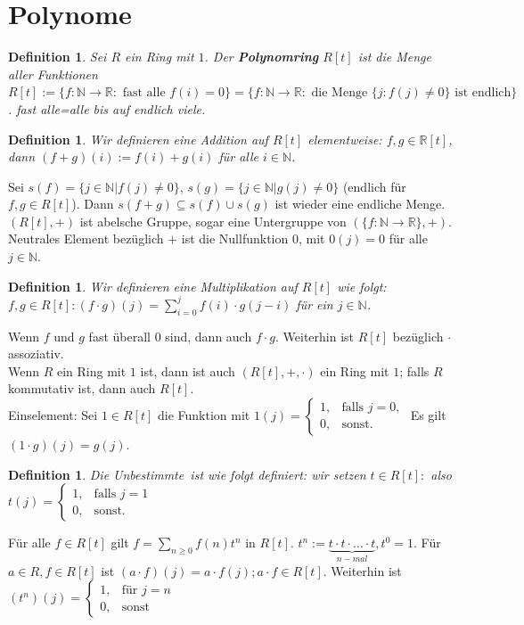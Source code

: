 \documentclass[12pt,a4paper]{article}
\theoremstyle{plain}
\newtheorem{Definition}[Theorem]{Definition}
\newcommand{\N}{\mathbb{N}}
\newcommand{\R}{\mathbb{R}}
\numberwithin{equation}{section}
\begin{document}
\section{Polynome}
\begin{Definition}
Sei $R$ ein Ring mit $1$. Der \textbf{Polynomring} $R[t]$ ist die Menge aller Funktionen $R[t]:=\{f:\N\rightarrow\R:\text{ fast alle }f(i)=0\}=\{f:\N\rightarrow\R:\text{ die Menge }\{j:f(j)\neq 0\}\text{ ist endlich}\}$. \glqq fast alle\grqq=\glqq alle bis auf endlich viele\grqq. 
\end{Definition}
\begin{Definition}
Wir definieren eine Addition auf $R[t]$ elementweise: $f,g\in\R[t]$, dann $(f+g)(i):=f(i)+g(i)$ für alle $i\in\N$. 
\end{Definition}
Sei $s(f)=\{j\in\N|f(j)\neq 0\}$, $s(g)=\{j\in\N|g(j)\neq 0\}$ (endlich für $f,g\in R[t]$). Dann $s(f+g)\subseteq s(f)\cup s(g)$ ist wieder eine endliche Menge. \\
$(R[t],+)$ ist abelsche Gruppe, sogar eine Untergruppe von $(\{f:\N\rightarrow\R\},+)$. Neutrales Element bezüglich $+$ ist die Nullfunktion $0$, mit $0(j)=0$ für alle $j\in\N$.
\begin{Definition}
Wir definieren eine Multiplikation auf $R[t]$ wie folgt: $f,g\in R[t]: (f\cdot g)(j)=\sum_{i=0}^j{f(i)\cdot g(j-i)}$ für ein $j\in\N$. 
\end{Definition} Wenn $f$ und $g$ fast überall $0$ sind, dann auch $f\cdot g$. Weiterhin ist $R[t]$ bezüglich $\cdot$ assoziativ.\\
Wenn $R$ ein Ring mit $1$ ist, dann ist auch $(R[t],+,\cdot)$ ein Ring mit $1$; falls $R$ kommutativ ist, dann auch $R[t]$.\\
Einselement: Sei $1\in R[t]$ die Funktion mit $1(j)=\left\lbrace\begin{array}{ll}1,&\text{falls }j=0,\\
0,&\text{sonst.}
\end{array}\right.$ Es gilt $(1\cdot g)(j)=g(j)$.
\begin{Definition}
Die \glqq Unbestimmte\grqq\ ist wie folgt definiert: wir setzen $t\in R[t]:$ also $t(j)=\left\lbrace\begin{array}{ll}1,&\text{falls }j=1\\
0,&\text{sonst.}
\end{array}\right.$ 
\end{Definition}
Für alle $f\in R[t]$ gilt $f=\sum_{n\geq 0}{f(n)t^n}$ in $R[t]$. $t^n:=\underbrace{t\cdot t\cdot\ldots\cdot t}_{n-mal},t^0=1$. Für $a\in R, f\in R[t]$ ist $(a\cdot f)(j)=a\cdot f(j); a\cdot f\in R[t]$. Weiterhin ist $(t^n)(j)=\left\lbrace\begin{array}{ll}1,&\text{für }j=n\\0,&\text{sonst}\end{array}\right.$\\
\end{document}
